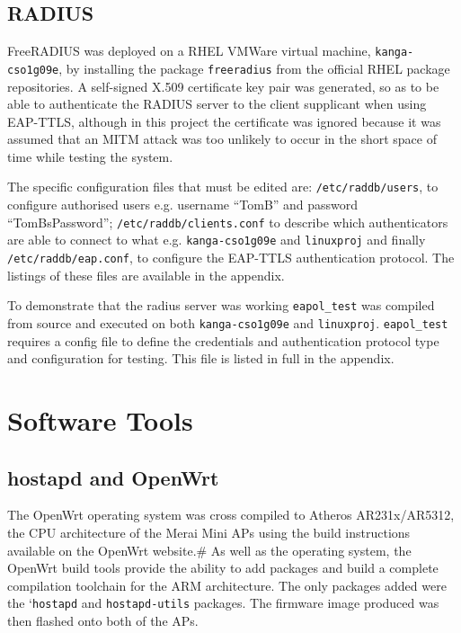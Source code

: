 \documentclass[pdftex, 12pt, a4paper]{article}
\begin{document}
\subsection{RADIUS}
FreeRADIUS was deployed on a RHEL VMWare virtual machine, \verb`kanga-cso1g09e`, by installing the package \verb`freeradius` from the official RHEL package repositories.  A self-signed X.509 certificate key pair was generated, so as to be able to authenticate the RADIUS server to the client supplicant when using EAP-TTLS, although in this project the certificate was ignored because it was assumed that an MITM attack was too unlikely to occur in the short space of time while testing the system.



The specific configuration files that must be edited are: \verb`/etc/raddb/users`, to configure authorised users e.g. username ``TomB'' and password ``TomBsPassword''; \verb`/etc/raddb/clients.conf` to describe which authenticators are able to connect to what e.g. \verb`kanga-cso1g09e` and \verb`linuxproj` and finally \verb`/etc/raddb/eap.conf`, to configure the EAP-TTLS authentication protocol.  The listings of these files are available in the appendix.

To demonstrate that the radius server was working \verb`eapol_test` was compiled from source and executed on both \verb`kanga-cso1g09e` and \verb`linuxproj`.  \verb`eapol_test` requires a config file to define the credentials and authentication protocol type and configuration for testing. This file is listed in full in the appendix.

\section{Software Tools}
\subsection{hostapd and OpenWrt}
The OpenWrt operating system was cross compiled to Atheros AR231x/AR5312, the CPU architecture of the Merai Mini APs using the build instructions available on the OpenWrt website.\# As well as the operating system, the OpenWrt build tools provide the ability to add packages and build a complete compilation toolchain for the ARM architecture.  The only packages added were the `\verb`hostapd` and \verb`hostapd-utils` packages.  The firmware image produced was then flashed onto both of the APs.
\end{document}
